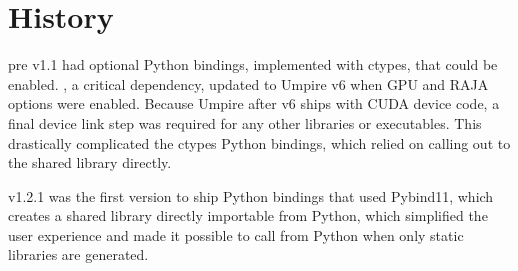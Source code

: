 \section{History}

\exago pre v1.1 had optional Python bindings, implemented with ctypes, that could be enabled. \hiop, a critical dependency, updated to Umpire v6 when GPU and RAJA options were enabled. Because Umpire after v6 ships with CUDA device code, a final device link step was required for any other libraries or executables. This drastically complicated the ctypes Python bindings, which relied on calling out to the shared library directly.

\exago v1.2.1 was the first version to ship Python bindings that used Pybind11, which creates a shared library directly importable from Python, which simplified the user experience and made it possible to call \exago from Python when only static libraries are generated.
